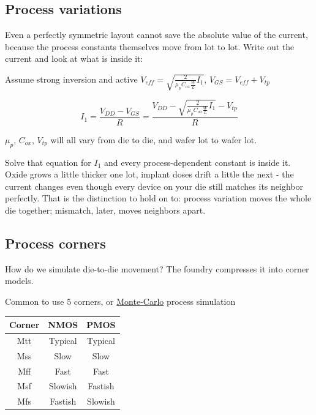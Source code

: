 \subsection{Process variations}\label{process-variations}

Even a perfectly symmetric layout cannot save the absolute value of the
current, because the process constants themselves move from lot to lot.
Write out the current and look at what is inside it:

Assume strong inversion and active
\textbf{\(V_{eff} = \sqrt{\frac{2}{\mu_p C_{ox} \frac{W}{L}} I_1}\)},
\(V_{GS} = V_{eff} + V_{tp}\)

\[ I_1 = \frac{V_{DD} - V_{GS}}{R} =  \frac{V_{DD} - \sqrt{\frac{2}{\mu_p C_{ox} \frac{W}{L}} I_1}  - V_{tp}}{R} \]

\(\mu_p\), \(C_{ox}\), \(V_{tp}\) will all vary from die to die, and
wafer lot to wafer lot.

Solve that equation for \(I_1\) and every process-dependent constant is
inside it. Oxide grows a little thicker one lot, implant doses drift a
little the next - the current changes even though every device on your
die still matches its neighbor perfectly. That is the distinction to
hold on to: process variation moves the whole die together; mismatch,
later, moves neighbors apart.

\subsection{Process corners}\label{process-corners}

How do we simulate die-to-die movement? The foundry compresses it into
corner models.

Common to use 5 corners, or
\href{https://en.wikipedia.org/wiki/Monte_Carlo_method}{Monte-Carlo}
process simulation

\begin{longtable}[]{@{}ccc@{}}
\toprule\noalign{}
Corner & NMOS & PMOS \\
\midrule\noalign{}
\endhead
\bottomrule\noalign{}
\endlastfoot
Mtt & Typical & Typical \\
Mss & Slow & Slow \\
Mff & Fast & Fast \\
Msf & Slowish & Fastish \\
Mfs & Fastish & Slowish \\
\end{longtable}

